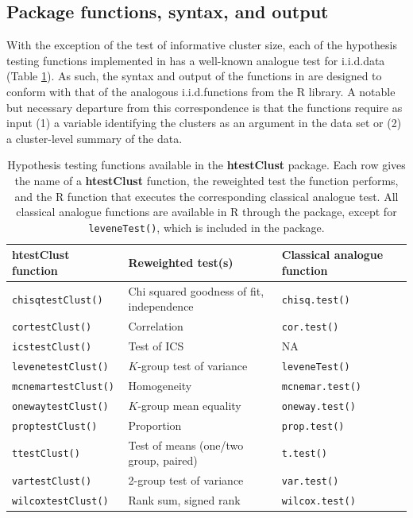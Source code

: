 \subsection[Functions and Behavior]{Package functions, syntax, and output} \label{ss:func}

With the exception of the test of informative cluster size, each of the hypothesis testing functions implemented in  has a well-known analogue test for i.i.d.\@ data (Table \ref{t:pckFun}). As such, the syntax and output of the functions in  are designed to conform with that of the analogous i.i.d.\@ functions from the R  library. A notable but necessary departure from this correspondence is that the  functions require as input (1) a variable identifying the clusters as an argument in the data set or (2) a cluster-level summary of the data.

\begin{table}[t!]
	\footnotesize
	\centering
	\renewcommand{\arraystretch}{1.25}
	\begin{tabular}{lll}
		\textbf{htestClust} function		 & Reweighted test(s)														& Classical analogue function \\
		\hline 
		\texttt{chisqtestClust()}	   & Chi squared goodness of fit, independence	  & \texttt{chisq.test()} \\
		\texttt{cortestClust()}	 	   & Correlation        													& \texttt{cor.test()}   \\
		\texttt{icstestClust()}			 & Test of ICS																	& NA	\\
		\texttt{levenetestClust()}	 & $K$-group test of variance       						& \texttt{leveneTest()} \\
		\texttt{mcnemartestClust()}	 & Homogeneity																	& \texttt{mcnemar.test()} \\
		\texttt{onewaytestClust()}	 & $K$-group mean equality		     						  & \texttt{oneway.test()} \\
		\texttt{proptestClust()}		 & Proportion 									  							& \texttt{prop.test()} \\
		\texttt{ttestClust()}				 & Test of means (one/two group, paired)				& \texttt{t.test()}  \\
		\texttt{vartestClust()}			 & 2-group test of variance       							& \texttt{var.test()} \\	
		\texttt{wilcoxtestClust()}   & Rank sum, signed rank 												& \texttt{wilcox.test()} \\
		\hline																		
	\end{tabular}
	\caption{\label{t:pckFun} Hypothesis testing functions available in the \textbf{htestClust} package. Each row gives the name of a \textbf{htestClust} function, the reweighted test the function performs, and the R function that executes the corresponding classical analogue test. All classical analogue functions are available in R through the  package, except for \texttt{leveneTest()}, which is included in the  package.}
\end{table}

